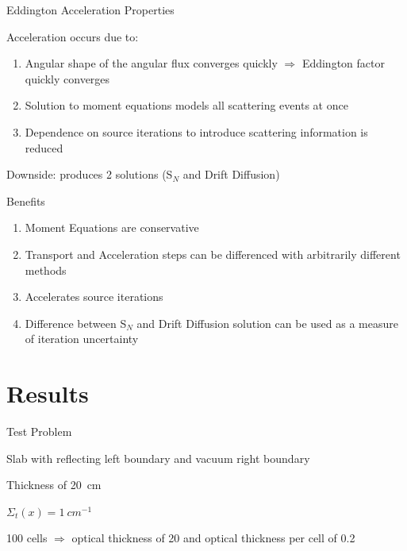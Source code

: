 \documentclass[10pt]{beamer}
\newcommand{\SN}{S$_N$\xspace}
\begin{document}
\begin{frame}{Eddington Acceleration Properties}
    
    Acceleration occurs due to: 
    \begin{enumerate}
    	\item Angular shape of the angular flux converges quickly $\Rightarrow$ Eddington factor quickly converges 

    	\item Solution to moment equations models all scattering events at once 

    	\item Dependence on source iterations to introduce scattering information is reduced

    \end{enumerate}

    Downside: produces 2 solutions (\SN and Drift Diffusion)

    Benefits 
    \begin{enumerate}
        \item Moment Equations are conservative 

        \item Transport and Acceleration steps can be differenced with arbitrarily different methods 

        \item Accelerates source iterations 

        \item Difference between \SN and Drift Diffusion solution can be used as a measure of iteration uncertainty 

    \end{enumerate}

\end{frame}

\section{Results}

\begin{frame}{Test Problem} 

	Slab with reflecting left boundary and vacuum right boundary 

    Thickness of \SI{20}{cm} 

    $\Sigma_t(x) = \SI{1}{cm^{-1}}$

    100 cells $\Rightarrow$ optical thickness of 20 and optical thickness per cell of 0.2 

\end{frame}
\end{document}
